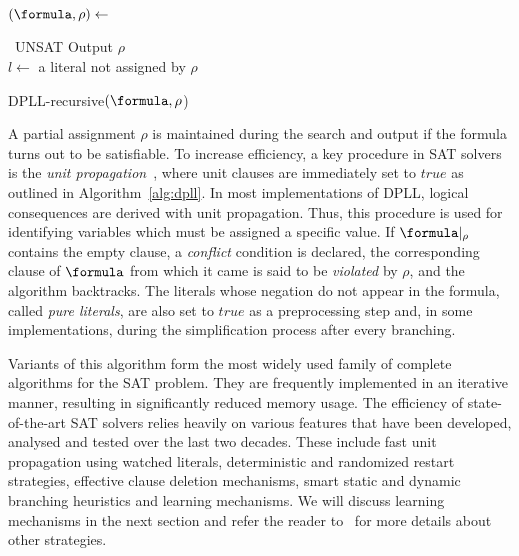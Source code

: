 \begin{algorithm}[htp]%
    \SetAlgoLined\DontPrintSemicolon%
    $(\formula, \rho) \leftarrow$ \proc{$\formula,\rho$}

    {\Return~UNSAT}
    {Output $\rho$\\
    }
    $l \leftarrow$ a literal not assigned by $\rho$

    {}

    \vspace{2mm}
    \setcounter{AlgoLine}{0}
    \caption{DPLL-recursive$(\formula, \rho$)}%
    \label{alg:dpll}
\end{algorithm} 

A partial assignment $\rho$ is maintained during the search and output if the
formula turns out to be satisfiable.  To increase efficiency, a key procedure in SAT
solvers is the \emph{unit propagation}~\cite{cdclchapter}, where unit clauses
are immediately set to $true$ as outlined in Algorithm~\ref{alg:dpll}. In most
implementations of DPLL, logical consequences are derived with unit propagation.
Thus, this procedure is used for identifying variables which must be assigned
a specific value. If $\formula |_\rho$ contains the empty clause, a
\emph{conflict} condition is declared, the corresponding clause of $\formula$
from which it came is said to be \emph{violated} by $\rho$, and the algorithm
backtracks. The literals whose negation do not appear in the formula, called
\emph{pure literals}, are also set to $true$ as a preprocessing step and, in
some implementations, during the simplification process after every branching. 

Variants of this algorithm form the most widely used family of complete
algorithms for the SAT problem. They are frequently implemented in an iterative
manner, resulting in significantly reduced memory usage. The efficiency of
state-of-the-art SAT solvers relies heavily on various features that have been
developed, analysed and tested over the last two decades. These include fast
unit propagation using watched literals, deterministic and randomized restart
strategies, effective clause deletion mechanisms, smart static and dynamic
branching heuristics and learning mechanisms. We will discuss learning
mechanisms in the next section and refer the reader to~\cite{satchapter} for
more details about other strategies.

